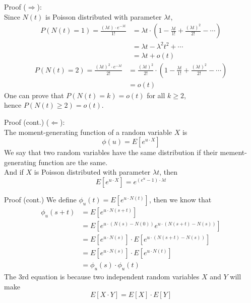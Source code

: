 \documentclass[mathserif]{beamer}
\begin{document}
\begin{frame}{Proof}
($\Longrightarrow$):\\
Since $N(t)$ is Poisson distributed with parameter $\lambda t$,
\begin{align*}
P(N(t)=1) = \frac{(\lambda t)\cdot e^{-\lambda t}}{1!} & = \lambda t 
	\cdot\left(1 - \frac{\lambda t}{1!} + \frac{(\lambda t)^2}{2!} - \cdots\right) \\
& = \lambda t - {\lambda}^2 t^2 + \cdots \\
& = \lambda t + o(t)
\end{align*}
\begin{align*}
P(N(t)=2) = \frac{(\lambda t)^2\cdot e^{-\lambda t}}{2!} & = \frac{(\lambda t)^2}{2!}
	\cdot\left(1 - \frac{\lambda t}{1!} + \frac{(\lambda t)^2}{2!} - \cdots\right) \\
& = o(t)
\end{align*}
One can prove that $P(N(t) = k) = o(t)$ for all $k \geq 2$,\\
hence $P(N(t)\geq 2) = o(t)$.
\end{frame}

\begin{frame}{Proof (cont.)}
($\Longleftarrow$):\\
The moment-generating function of a random variable $X$ is
\[
\phi(u) = E[e^{u\cdot X}]
\]
We say that two random variables have the same distribution if their mement-generating function are the same.\\
And if $X$ is Poisson distributed with parameter $\lambda t$, then
\[
E[e^{u\cdot X}] = e^{(e^u - 1)\cdot \lambda t}
\]
\end{frame}

\begin{frame}{Proof (cont.)}
We define $\phi_u(t) = E[e^{u\cdot N(t)}]$, then we know that
\begin{align*}
\phi_u(s+t) & = E[e^{u\cdot N(s+t)}] \\
& = E[e^{u\cdot(N(s)-N(0))} e^{u\cdot(N(s+t)-N(s))}] \\
& = E[e^{u\cdot N(s)}]\cdot E[e^{u\cdot (N(s+t) - N(s))}] \\
& = E[e^{u\cdot N(s)}]\cdot E[e^{u\cdot N(t)}] \\
& = \phi_u(s)\cdot \phi_u(t)
\end{align*}
The 3rd equation is because two independent random variables $X$ and $Y$ will make
\[
E[X\cdot Y] = E[X]\cdot E[Y]
\]
\end{frame}
\end{document}
